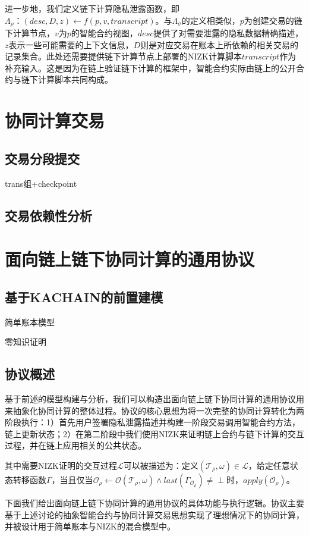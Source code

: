 进一步地，我们定义链下计算隐私泄露函数，即$\Lambda_\rho：(desc, D, z) \leftarrow f(p, v, transcript)$。与$\Lambda_\sigma$的定义相类似，$p$为创建交易的链下计算节点，$v$为$p$的智能合约视图，$desc$提供了对需要泄露的隐私数据精确描述，$z$表示一些可能需要的上下文信息，$D$则是对应交易在账本上所依赖的相关交易的记录集合。此处还需要提供链下计算节点上部署的NIZK计算脚本$transcript$作为补充输入。这是因为在链上验证链下计算的框架中，智能合约实际由链上的公开合约与链下计算脚本共同构成。
\section{协同计算交易}

\subsection{交易分段提交}

trans组+checkpoint
\subsection{交易依赖性分析}

\section{面向链上链下协同计算的通用协议}
\subsection{基于KACHAIN的前置建模}
简单账本模型

零知识证明
\subsection{协议概述}
基于前述的模型构建与分析，我们可以构造出面向链上链下协同计算的通用协议用来抽象化协同计算的整体过程。协议的核心思想为将一次完整的协同计算转化为两阶段执行：1）首先用户签署隐私泄露描述并构建一阶段交易调用智能合约方法，链上更新状态；2）在第二阶段中我们使用NIZK来证明链上合约与链下计算的交互过程，并在链上应用相关的公共状态。

其中需要NIZK证明的交互过程$\mathcal{L}$可以被描述为：定义$(\mathcal{T}_\rho, \omega) \in \mathcal{L}$，给定任意状态转移函数$\Gamma$，当且仅当$\mathcal{O}_\rho \leftarrow \mathcal{O}(\mathcal{T}_\rho, \omega)\wedge last(\Gamma_{\mathcal{O}_\rho}) \neq \perp$时，$apply(\mathcal{O}_\rho)$。

下面我们给出面向链上链下协同计算的通用协议的具体功能与执行逻辑。协议主要基于上述讨论的抽象智能合约与协同计算交易思想实现了理想情况下的协同计算，并被设计用于简单账本与NIZK的混合模型中。

